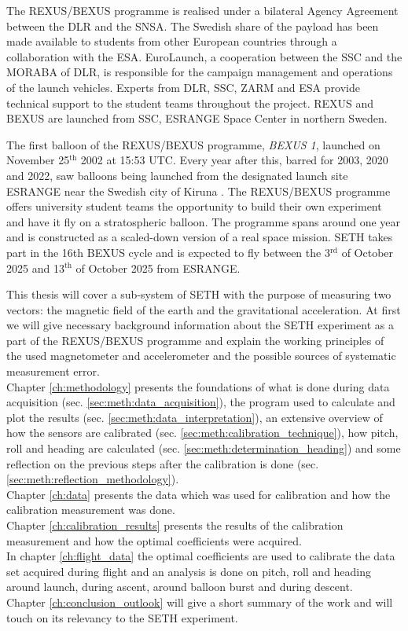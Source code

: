 The \acs{REXUS}/\acs{BEXUS} programme is realised under a bilateral Agency Agreement between the \acf{DLR} and the \acf{SNSA}. The Swedish share of the payload has been made available to students from other European countries through a collaboration with the \acf{ESA}. EuroLaunch, a cooperation between the \acf{SSC} and the \acf{MORABA} of \acs{DLR}, is responsible for the campaign management and operations of the launch vehicles. Experts from \acs{DLR}, \acs{SSC}, \acs{ZARM} and \acs{ESA} provide technical support to the student teams throughout the project. \acs{REXUS} and \acs{BEXUS} are launched from \acs{SSC}, \acs{ESRANGE} Space Center in northern Sweden.

The first balloon of the \acs{REXUS}/\acs{BEXUS} programme, \textit{BEXUS 1}, launched on November 25$^{\mathrm{th}}$ 2002 at 15:53 UTC. Every year after this, barred for 2003, 2020 and 2022, saw balloons being launched from the designated launch site \ac{ESRANGE} near the Swedish city of Kiruna \parencite{IAC-08.E.1.1.4}\parencite{bexus-campaign-history}.
The \ac{REXUS}/\ac{BEXUS} programme offers university student teams the opportunity to build their own experiment and have it fly on a stratospheric balloon. The programme spans around one year and is constructed as a scaled-down version of a real space mission. \ac{SETH} takes part in the 16th \ac{BEXUS} cycle and is expected to fly between the 3$^\mathrm{rd}$ of October 2025 and 13$^\mathrm{th}$ of October 2025 from \ac{ESRANGE}.

This thesis will cover a sub-system of \ac{SETH} with the purpose of measuring two vectors: the magnetic field of the earth and the gravitational acceleration. At first we will give necessary background information about the \ac{SETH} experiment as a part of the \ac{REXUS}/\ac{BEXUS} programme and explain the working principles of the used magnetometer and accelerometer and the possible sources of systematic measurement error.\\
Chapter \ref{ch:methodology} presents the foundations of what is done during data acquisition (sec. \ref{sec:meth:data_acquisition}), the program used to calculate and plot the results (sec. \ref{sec:meth:data_interpretation}), an extensive overview of how the sensors are calibrated (sec. \ref{sec:meth:calibration_technique}), how pitch, roll and heading are calculated (sec. \ref{sec:meth:determination_heading}) and some reflection on the previous steps after the calibration is done (sec. \ref{sec:meth:reflection_methodology}).\\
Chapter \ref{ch:data} presents the data which was used for calibration and how the calibration measurement was done.\\
Chapter \ref{ch:calibration_results} presents the results of the calibration measurement and how the optimal coefficients were acquired.\\
In chapter \ref{ch:flight_data} the optimal coefficients are used to calibrate the data set acquired during flight and an analysis is done on pitch, roll and heading around launch, during ascent, around balloon burst and during descent.\\
Chapter \ref{ch:conclusion_outlook} will give a short summary of the work and will touch on its relevancy to the \ac{SETH} experiment.